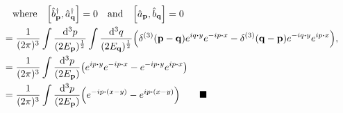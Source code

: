 \documentclass{article}
\begin{document}
\begin{align*}
                                                & \qq{where}\bqty{\hat{b}^\dagger_{\vb{p}},\hat{a}^\dagger_{\vb{q}}}=0\qand\bqty{\hat{a}_{\vb{p}},\hat{b}_{\vb{q}}}=0                                                                                                                                                                                                                                                                                                 \\
                                                & =\frac{1}{(2\pi)^3}\int\frac{\dd[3]{p}}{(2E_{\vb{p}})^{\frac{1}{2}}}\int   \frac{\dd[3]{q}}{(2E_{\vb{q}})^{\frac{1}{2}}}     \pqty{\delta^{(3)}(\vb{p}-\vb{q})e^{iq\vdot y}e^{-ip\vdot x}-\delta^{(3)}(\vb{q}-\vb{p})e^{-iq\vdot y}e^{ip\vdot x}}\qcomma                                                                                                                                                            \\
                                                & =\frac{1}{(2\pi)^3}\int\frac{\dd[3]{p}}{(2E_{\vb{p}})}    \pqty{e^{ip\vdot y}e^{-ip\vdot x}-e^{-ip\vdot y}e^{ip\vdot x}}                                                                                                                                                                                                                                                                                            \\
                                                & =\frac{1}{(2\pi)^3}\int\frac{\dd[3]{p}}{(2E_{\vb{p}})}    \pqty{e^{-ip\vdot(x-y)}-e^{ip\vdot(x-y) }}  \qquad\blacksquare                                                                                                                                                                                                                                                                                            \\
\end{align*}
\end{document}
